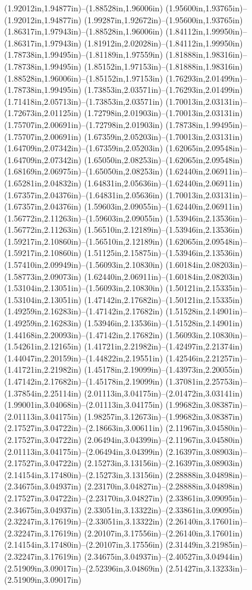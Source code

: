 (1.92012in,1.94877in)--(1.88528in,1.96006in) (1.95600in,1.93765in)--(1.92012in,1.94877in) (1.99287in,1.92672in)--(1.95600in,1.93765in) (1.86317in,1.97943in)--(1.88528in,1.96006in) (1.84112in,1.99950in)--(1.86317in,1.97943in) (1.81912in,2.02028in)--(1.84112in,1.99950in) (1.78738in,1.99495in)--(1.81189in,1.97559in) (1.81888in,1.98316in)--(1.78738in,1.99495in) (1.85152in,1.97153in)--(1.81888in,1.98316in) (1.88528in,1.96006in)--(1.85152in,1.97153in) (1.76293in,2.01499in)--(1.78738in,1.99495in) (1.73853in,2.03571in)--(1.76293in,2.01499in) (1.71418in,2.05713in)--(1.73853in,2.03571in) (1.70013in,2.03131in)--(1.72673in,2.01125in) (1.72798in,2.01903in)--(1.70013in,2.03131in) (1.75707in,2.00691in)--(1.72798in,2.01903in) (1.78738in,1.99495in)--(1.75707in,2.00691in) (1.67359in,2.05203in)--(1.70013in,2.03131in) (1.64709in,2.07342in)--(1.67359in,2.05203in) (1.62065in,2.09548in)--(1.64709in,2.07342in) (1.65050in,2.08253in)--(1.62065in,2.09548in) (1.68169in,2.06975in)--(1.65050in,2.08253in) (1.62440in,2.06911in)--(1.65281in,2.04832in) (1.64831in,2.05636in)--(1.62440in,2.06911in) (1.67357in,2.04376in)--(1.64831in,2.05636in) (1.70013in,2.03131in)--(1.67357in,2.04376in) (1.59603in,2.09055in)--(1.62440in,2.06911in) (1.56772in,2.11263in)--(1.59603in,2.09055in) (1.53946in,2.13536in)--(1.56772in,2.11263in) (1.56510in,2.12189in)--(1.53946in,2.13536in) (1.59217in,2.10860in)--(1.56510in,2.12189in) (1.62065in,2.09548in)--(1.59217in,2.10860in) (1.51125in,2.15875in)--(1.53946in,2.13536in) (1.57410in,2.09949in)--(1.56093in,2.10830in) (1.60184in,2.08203in)--(1.58773in,2.09073in) (1.62440in,2.06911in)--(1.60184in,2.08203in) (1.53104in,2.13051in)--(1.56093in,2.10830in) (1.50121in,2.15335in)--(1.53104in,2.13051in) (1.47142in,2.17682in)--(1.50121in,2.15335in) (1.49259in,2.16283in)--(1.47142in,2.17682in) (1.51528in,2.14901in)--(1.49259in,2.16283in) (1.53946in,2.13536in)--(1.51528in,2.14901in) (1.44168in,2.20093in)--(1.47142in,2.17682in) (1.56093in,2.10830in)--(1.54261in,2.12165in) (1.41721in,2.21982in)--(1.42497in,2.21374in) (1.44047in,2.20159in)--(1.44822in,2.19551in) (1.42546in,2.21257in)--(1.41721in,2.21982in) (1.45178in,2.19099in)--(1.43973in,2.20055in) (1.47142in,2.17682in)--(1.45178in,2.19099in) (1.37081in,2.25753in)--(1.37854in,2.25114in) (2.01113in,3.04175in)--(2.01472in,3.03141in) (1.99001in,3.04068in)--(2.01113in,3.04175in) (1.99682in,3.08387in)--(2.01113in,3.04175in) (1.98257in,3.12673in)--(1.99682in,3.08387in) (2.17527in,3.04722in)--(2.18663in,3.00611in) (2.11967in,3.04580in)--(2.17527in,3.04722in) (2.06494in,3.04399in)--(2.11967in,3.04580in) (2.01113in,3.04175in)--(2.06494in,3.04399in) (2.16397in,3.08903in)--(2.17527in,3.04722in) (2.15273in,3.13156in)--(2.16397in,3.08903in) (2.14154in,3.17480in)--(2.15273in,3.13156in) (2.28888in,3.04898in)--(2.34675in,3.04937in) (2.23170in,3.04827in)--(2.28888in,3.04898in) (2.17527in,3.04722in)--(2.23170in,3.04827in) (2.33861in,3.09095in)--(2.34675in,3.04937in) (2.33051in,3.13322in)--(2.33861in,3.09095in) (2.32247in,3.17619in)--(2.33051in,3.13322in) (2.26140in,3.17601in)--(2.32247in,3.17619in) (2.20107in,3.17556in)--(2.26140in,3.17601in) (2.14154in,3.17480in)--(2.20107in,3.17556in) (2.31449in,3.21985in)--(2.32247in,3.17619in) (2.34675in,3.04937in)--(2.40527in,3.04944in) (2.51909in,3.09017in)--(2.52396in,3.04869in) (2.51427in,3.13233in)--(2.51909in,3.09017in) 